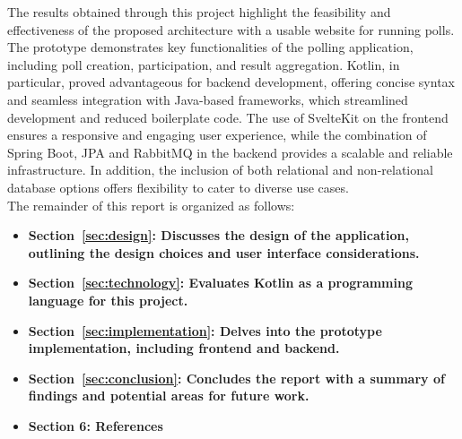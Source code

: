 The results obtained through this project highlight the feasibility and effectiveness of the proposed architecture with a usable website for running polls.
The prototype demonstrates key functionalities of the polling application, including poll creation, participation, and result aggregation.
Kotlin, in particular, proved advantageous for backend development, offering concise syntax and seamless integration with Java-based frameworks, which streamlined development and reduced boilerplate code.
The use of SvelteKit on the frontend ensures a responsive and engaging user experience, while the combination of Spring Boot, JPA and RabbitMQ in the backend provides a scalable and reliable infrastructure.
In addition, the inclusion of both relational and non-relational database options offers flexibility to cater to diverse use cases. \\

The remainder of this report is organized as follows:
\begin{itemize}
    \item \textbf{Section~\ref{sec:design}: Discusses the design of the application, outlining the design choices and user interface considerations.}
    \item \textbf{Section~\ref{sec:technology}: Evaluates Kotlin as a programming language for this project.}
    \item \textbf{Section~\ref{sec:implementation}: Delves into the prototype implementation, including frontend and backend.}
    \item \textbf{Section~\ref{sec:conclusion}: Concludes the report with a summary of findings and potential areas for future work.}
    \item \textbf{Section 6: References}
\end{itemize}
